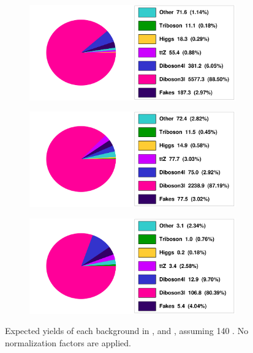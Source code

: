 \begin{figure}[tbp]
    \centering
    \begin{subfigure}[b]{0.49\textwidth}
      \centering
      \includegraphics[width=0.98\textwidth]{figs/rpvthreel/CRWZ_yields.png}
      \caption{}
      \label{fig:CRWZ_yields}
    \end{subfigure}
    \hfill
    \begin{subfigure}[b]{0.49\textwidth}
      \centering
      \includegraphics[width=0.98\textwidth]{figs/rpvthreel/VRMet_yields.png}
      \caption{}
      \label{fig:VRMet_yields}
    \end{subfigure}
    \hfill
    \begin{subfigure}[b]{0.49\textwidth}
      \centering
      \includegraphics[width=0.98\textwidth]{figs/rpvthreel/VRmTmin_yields.png}
      \caption{}
      \label{fig:VRmTmin_yields}
    \end{subfigure}
  \caption[Expected yields of each background in \CRWZ, \VRmet and \VRmTmin, assuming 140 \ifb. No normalization factors are applied.]
          {Expected yields of each background in \CRWZ, \VRmet and \VRmTmin, assuming 140 \ifb. No normalization factors are applied.}
   \label{fig:CRVRWZ_yields}
\end{figure}
